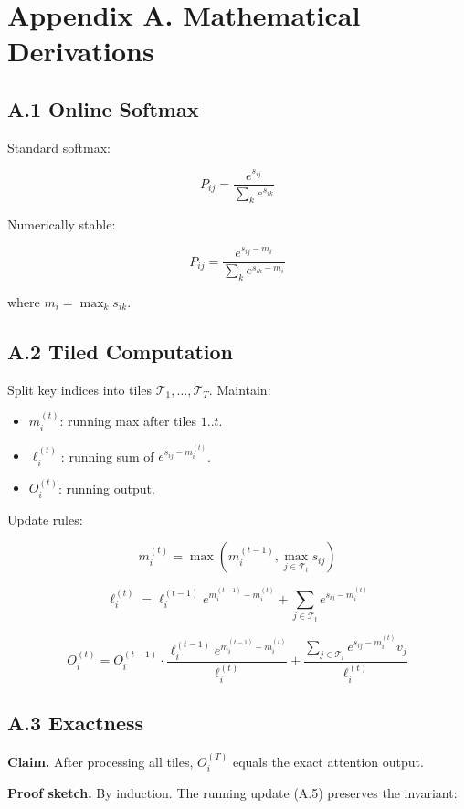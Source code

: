\section{Appendix A. Mathematical Derivations}

\subsection{A.1 Online Softmax}

Standard softmax:

\[
P_{ij} = \frac{e^{s_{ij}}}{\sum_k e^{s_{ik}}}
\tag{A.1}
\]

Numerically stable:

\[
P_{ij} = \frac{e^{s_{ij} - m_i}}{\sum_k e^{s_{ik} - m_i}}
\tag{A.2}
\]

where $m_i = \max_k s_{ik}$.

\subsection{A.2 Tiled Computation}

Split key indices into tiles $\mathcal{T}_1, \ldots, \mathcal{T}_T$. Maintain:

\begin{itemize}
\item $m_i^{(t)}$: running max after tiles $1..t$.
\item $\ell_i^{(t)}$: running sum of $e^{s_{ij} - m_i^{(t)}}$.
\item $O_i^{(t)}$: running output.

\end{itemize}
Update rules:

\[
m_i^{(t)} = \max(m_i^{(t-1)}, \max_{j \in \mathcal{T}_t} s_{ij})
\tag{A.3}
\]

\[
\ell_i^{(t)} = \ell_i^{(t-1)} e^{m_i^{(t-1)} - m_i^{(t)}} + \sum_{j \in \mathcal{T}_t} e^{s_{ij} - m_i^{(t)}}
\tag{A.4}
\]

\[
O_i^{(t)} = O_i^{(t-1)} \cdot \frac{\ell_i^{(t-1)} e^{m_i^{(t-1)} - m_i^{(t)}}}{\ell_i^{(t)}} + \frac{\sum_{j \in \mathcal{T}_t} e^{s_{ij} - m_i^{(t)}} v_j}{\ell_i^{(t)}}
\tag{A.5}
\]

\subsection{A.3 Exactness}

\textbf{Claim.} After processing all tiles, $O_i^{(T)}$ equals the exact attention 
output.

\textbf{Proof sketch.} By induction. The running update (A.5) preserves the 
invariant:

